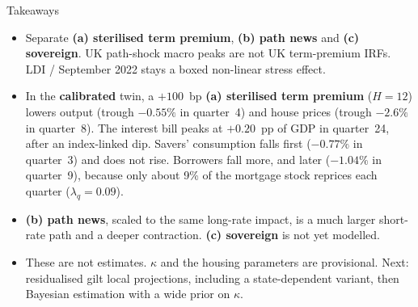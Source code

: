 \documentclass[11pt,aspectratio=169]{beamer}
\begin{document}
\begin{frame}{Takeaways}
  \begin{itemize}
    \item Separate \textbf{(a) sterilised term premium},
          \textbf{(b) path news} and \textbf{(c) sovereign}.
          UK path-shock macro peaks are not UK term-premium IRFs.
          LDI / September 2022 stays a boxed non-linear stress effect.
    \item In the \textbf{calibrated} twin, a $+100$~bp
          \textbf{(a) sterilised term premium} ($H=12$) lowers output
          (trough $-0.55\%$ in quarter~4) and house prices
          (trough $-2.6\%$ in quarter~8). The interest bill peaks at
          $+0.20$~pp of GDP in quarter~24, after an index-linked dip.
          Savers' consumption falls first ($-0.77\%$ in quarter~3) and
          does not rise. Borrowers fall more, and later
          ($-1.04\%$ in quarter~9), because only about 9\% of the
          mortgage stock reprices each quarter ($\lambda_q=0.09$).
    \item \textbf{(b) path news}, scaled to the same long-rate impact,
          is a much larger short-rate path and a deeper contraction.
          \textbf{(c) sovereign} is not yet modelled.
    \item These are not estimates. $\kappa$ and the housing parameters
          are provisional. Next: residualised gilt local projections,
          including a state-dependent variant, then Bayesian estimation
          with a wide prior on $\kappa$.
  \end{itemize}
\end{frame}

\end{document}

